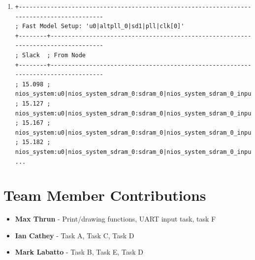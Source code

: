 \documentclass[10pt]{article}
\begin{document}
\begin{enumerate}
    \item[]
        \begin{verbatim}
+-------------------------------------------------------------------------------------------
; Fast Model Setup: 'u0|altpll_0|sd1|pll|clk[0]'                                            
+--------+----------------------------------------------------------------------------------
; Slack  ; From Node                                                                        
+--------+----------------------------------------------------------------------------------
; 15.098 ; nios_system:u0|nios_system_sdram_0:sdram_0|nios_system_sdram_0_input_efifo_module
; 15.127 ; nios_system:u0|nios_system_sdram_0:sdram_0|nios_system_sdram_0_input_efifo_module
; 15.167 ; nios_system:u0|nios_system_sdram_0:sdram_0|nios_system_sdram_0_input_efifo_module
; 15.182 ; nios_system:u0|nios_system_sdram_0:sdram_0|nios_system_sdram_0_input_efifo_module
...
        \end{verbatim}
\end{enumerate}

\section*{Team Member Contributions}
\begin{itemize}
    \item \textbf{Max Thrun} - Print/drawing functions, UART input task, task F
    \item \textbf{Ian Cathey} - Task A, Task C, Task D
    \item \textbf{Mark Labatto} - Task B, Task E, Task D
\end{itemize}
\end{document}
